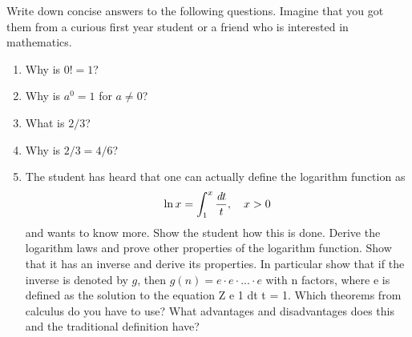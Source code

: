 \begin{assignment}
Write down concise answers to the following questions. Imagine that you
got them from a curious first year student or a friend who is interested in
mathematics.
\begin{enumerate}[wide]
\item Why is $0! = 1$?
\item Why is $a^0 = 1$ for $a \neq 0$?
\item What is $2/3$?
\item Why is $2/3 = 4/6$?
\item The student has heard that one can actually define the logarithm
function as
\[
\ln x =\int_1^x \frac{\emph{d} t}{t}, \quad x >0
\]
and wants to know more. Show the student how this is done. Derive the logarithm laws and prove other properties of the logarithm function. Show that it has an inverse and derive its properties. In particular show that if the inverse is denoted by $g$, then $g(n) = e·e·. . .·e$
with n factors, where e is defined as the solution to the equation
Z e
1
dt
t
= 1.
Which theorems from calculus do you have to use? What advantages
and disadvantages does this and the traditional definition have?
\end{enumerate}
\end{assignment}
